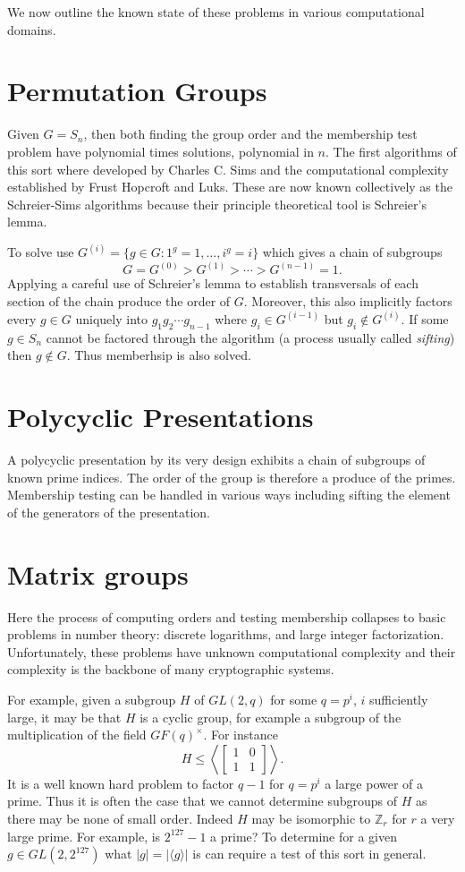 \documentclass[12pt]{article}
\begin{document}
We now outline the known state of these problems in various computational domains.

\section{Permutation Groups}

Given $G=S_n$, then both finding the group order and the membership test problem have polynomial times solutions, polynomial in $n$.  The first algorithms of this sort where developed by Charles C. Sims and the computational complexity established by Frust Hopcroft and Luks.  These are now known collectively as the Schreier-Sims algorithms because their principle theoretical tool is Schreier's lemma.

To solve use $G^{(i)}=\{g\in G:1^g=1,\dots,i^g=i\}$ which gives a chain of subgroups
\[G=G^{(0)}>G^{(1)}>\cdots >G^{(n-1)}=1.\]
Applying a careful use of Schreier's lemma to establish transversals of each section of the chain produce the order of $G$.  Moreover, this also implicitly factors every $g\in G$ uniquely into $g_1 g_2\cdots g_{n-1}$ where $g_i\in G^{(i-1)}$ but $g_i\notin G^{(i)}$.  If some $g\in S_n$ cannot be factored through the algorithm (a process usually called \emph{sifting}) then $g\notin G$.  Thus memberhsip is also solved.

\section{Polycyclic Presentations}

A polycyclic presentation by its very design exhibits a chain of subgroups of known prime indices.  The order of the group is therefore a produce of the primes.  Membership testing can be handled in various ways including sifting the element of the generators of the presentation.


\section{Matrix groups}

Here the process of computing orders and testing membership collapses to basic problems in number theory: discrete logarithms, and large integer factorization.  Unfortunately, these problems have unknown computational complexity and their complexity is the backbone of many cryptographic systems.

For example, given a subgroup $H$ of $GL(2,q)$ for some $q=p^i$, $i$ sufficiently large, it may be that $H$ is a cyclic group, for example a subgroup of the multiplication of the field $GF(q)^\times$.  For instance
\[H\leq \left\langle\begin{bmatrix}1 & 0 \\ 1 & 1\end{bmatrix}\right\rangle.\]  
It is a well known hard problem to factor $q-1$ for $q=p^i$ a large power of a prime.  Thus it is often the case that we cannot determine subgroups of $H$ as there may be none of small order.  Indeed $H$ may be isomorphic to $\mathbb{Z}_r$ for $r$ a very large prime.  For example, is $2^{127}-1$ a prime?
To determine for a given $g\in GL(2,2^{127})$ what $|g|=|\langle g\rangle|$ is can require a test of this sort in general.
\end{document}
